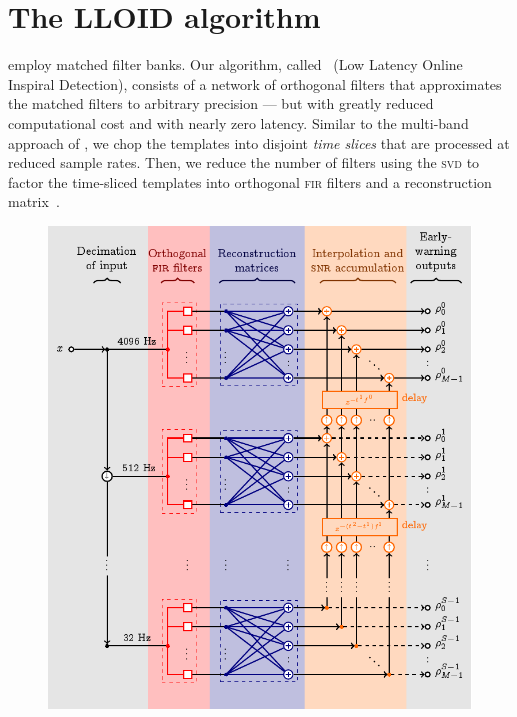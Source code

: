 \documentclass[portrait,plainboxedsections]{sciposter}
\begin{document}
\begin{minipage}[t]{0.4\textwidth}

\section*{The LLOID algorithm}

 employ matched
filter banks.
Our algorithm, called \lloid{}~(Low Latency Online Inspiral Detection),
consists of a network of orthogonal filters that approximates the matched filters to arbitrary
precision --- but with greatly reduced computational cost and with nearly zero latency.
Similar to the multi-band approach of \citet{Buskulic2010}, we chop the templates into
disjoint \emph{time slices} that are processed at reduced sample rates.
Then, we reduce the number of filters using the \textsc{svd}
to factor the time-sliced templates
into orthogonal \textsc{fir} filters and a reconstruction matrix~\citep{Cannon:2010p10398}.
\begin{figure}[h!]
	\begin{center}
		\includegraphics[width=\textwidth]{figures/lloid-diagram}

\end{center}
\end{figure}
\end{minipage}
\end{document}
